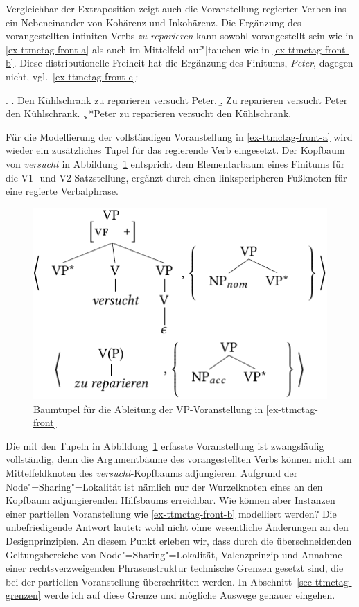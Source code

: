 Vergleichbar der Extraposition zeigt auch die Voranstellung regierter Verben ins  ein Nebeneinander von Kohärenz und Inkohärenz. Die Ergänzung des vorangestellten infiniten Verbs {\it zu reparieren} kann sowohl vorangestellt sein wie in \ref{ex-ttmctag-front-a} als auch im Mittelfeld auf"|tauchen wie in \ref{ex-ttmctag-front-b}. Diese distributionelle Freiheit hat die Ergänzung des Finitums, {\it Peter}, dagegen nicht, vgl.\ \ref{ex-ttmctag-front-c}: 

\ex. \label{ex-ttmctag-front}
\a. Den Kühlschrank zu reparieren versucht Peter. \label{ex-ttmctag-front-a}
\b. Zu reparieren versucht Peter den Kühlschrank. \label{ex-ttmctag-front-b}
\c. *Peter zu reparieren versucht den Kühlschrank. \label{ex-ttmctag-front-c}

Für die Modellierung der vollständigen Voranstellung in \ref{ex-ttmctag-front-a} wird wieder ein zusätzliches Tupel für das regierende Verb eingesetzt. Der Kopfbaum von {\it versucht} in Abbildung~\ref{fig-ttmctag-front} entspricht dem Elementarbaum eines Finitums für die V1- und V2-Satzstellung, ergänzt durch einen linksperipheren Fu\ss knoten für eine regierte Verbalphrase.

\begin{figure}[t]
\centering
\includegraphics{graphics/abb716.pdf}
\caption{\label{fig-ttmctag-front}Baumtupel für die Ableitung der VP-Voranstellung in \ref{ex-ttmctag-front}}
\end{figure}

Die mit den Tupeln in Abbildung~\ref{fig-ttmctag-front} erfasste Voranstellung ist zwangsläufig vollständig, denn die Argumentbäume des vorangestellten Verbs können nicht am Mittelfeldknoten des {\it versucht}-Kopfbaums adjungieren. Aufgrund der Node"=Sharing"=Lokalität ist nämlich nur der Wurzelknoten eines an den Kopfbaum adjungierenden Hilfsbaums erreichbar. Wie können aber Instanzen einer partiellen Voranstellung wie \ref{ex-ttmctag-front-b} modelliert werden? Die unbefriedigende Antwort lautet: wohl nicht ohne wesentliche Änderungen an den Designprinzipien. An diesem Punkt erleben wir, dass durch die überschneidenden Geltungsbereiche von Node"=Sharing"=Lokalität, Valenzprinzip und Annahme einer rechtsverzweigenden Phrasenstruktur technische Grenzen gesetzt sind, die bei der partiellen Voranstellung überschritten werden. In Abschnitt~\ref{sec-ttmctag-grenzen} werde ich auf diese Grenze und mögliche Auswege genauer eingehen.

